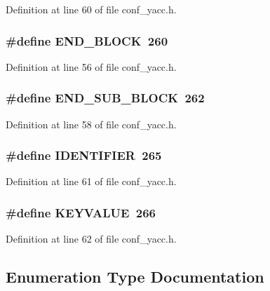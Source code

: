 Definition at line 60 of file conf\_\-yacc.h.
\subsubsection[{END\_\-BLOCK}]{\setlength{\rightskip}{0pt plus 5cm}\#define END\_\-BLOCK~260}\label{conf__yacc_8h_a1e33ae802796dae8694948b87ac62d61}


Definition at line 56 of file conf\_\-yacc.h.
\subsubsection[{END\_\-SUB\_\-BLOCK}]{\setlength{\rightskip}{0pt plus 5cm}\#define END\_\-SUB\_\-BLOCK~262}\label{conf__yacc_8h_a73651ad88c3904ffeed68fc6d15c88ff}


Definition at line 58 of file conf\_\-yacc.h.
\subsubsection[{IDENTIFIER}]{\setlength{\rightskip}{0pt plus 5cm}\#define IDENTIFIER~265}\label{conf__yacc_8h_a45734d64ac1283048289925ad7b30dfe}


Definition at line 61 of file conf\_\-yacc.h.
\subsubsection[{KEYVALUE}]{\setlength{\rightskip}{0pt plus 5cm}\#define KEYVALUE~266}\label{conf__yacc_8h_a15956324a82088a2f23c936061145a97}


Definition at line 62 of file conf\_\-yacc.h.

\subsection{Enumeration Type Documentation}
